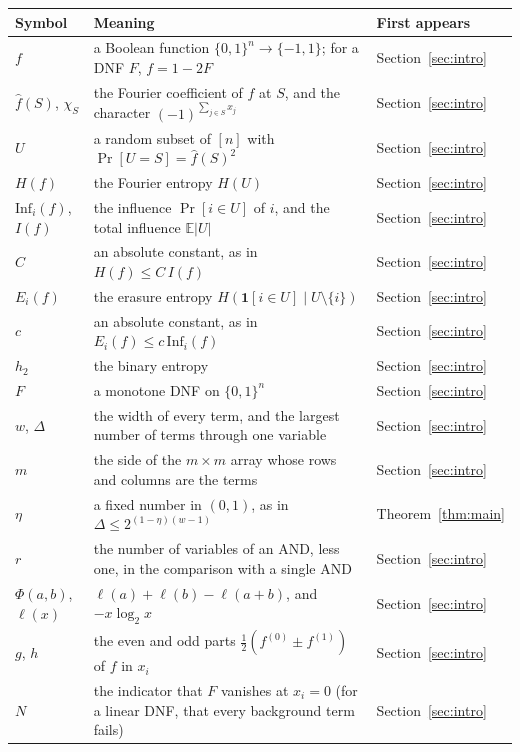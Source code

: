 \documentclass[11pt]{amsart}
\theoremstyle{remark}
\newcommand{\Inf}{\mathrm{Inf}}
\newcommand{\E}{\mathbb{E}}
\begin{document}
\begin{longtable}{@{}>{\raggedright\arraybackslash}p{}>{\raggedright\arraybackslash}p{}>{\raggedright\arraybackslash}p{}@{}}
\toprule
Symbol & Meaning & First appears \\
\midrule
\endhead
$f$ & a Boolean function $\{0,1\}^n\to\{-1,1\}$; for a DNF $F$, $f=1-2F$ & Section~\ref{sec:intro} \\
$\hat f(S)$, $\chi_S$ & the Fourier coefficient of $f$ at $S$, and the character $(-1)^{\sum_{j\in S}x_j}$ & Section~\ref{sec:intro} \\
$U$ & a random subset of $[n]$ with $\Pr[U=S]=\hat f(S)^2$ & Section~\ref{sec:intro} \\
$H(f)$ & the Fourier entropy $H(U)$ & Section~\ref{sec:intro} \\
$\Inf_i(f)$, $I(f)$ & the influence $\Pr[i\in U]$ of $i$, and the total influence $\E|U|$ & Section~\ref{sec:intro} \\
$C$ & an absolute constant, as in $H(f)\le C\,I(f)$ & Section~\ref{sec:intro} \\
$E_i(f)$ & the erasure entropy $H(\mathbf 1[i\in U]\mid U\setminus\{i\})$ & Section~\ref{sec:intro} \\
$c$ & an absolute constant, as in $E_i(f)\le c\,\Inf_i(f)$ & Section~\ref{sec:intro} \\
$h_2$ & the binary entropy & Section~\ref{sec:intro} \\
$F$ & a monotone DNF on $\{0,1\}^n$ & Section~\ref{sec:intro} \\
$w$, $\Delta$ & the width of every term, and the largest number of terms through one variable & Section~\ref{sec:intro} \\
$m$ & the side of the $m\times m$ array whose rows and columns are the terms & Section~\ref{sec:intro} \\
$\eta$ & a fixed number in $(0,1)$, as in $\Delta\le2^{(1-\eta)(w-1)}$ & Theorem~\ref{thm:main} \\
$r$ & the number of variables of an AND, less one, in the comparison with a single AND & Section~\ref{sec:intro} \\
$\Phi(a,b)$, $\ell(x)$ & $\ell(a)+\ell(b)-\ell(a+b)$, and $-x\log_2x$ & Section~\ref{sec:intro} \\
$g$, $h$ & the even and odd parts $\frac12(f^{(0)}\pm f^{(1)})$ of $f$ in $x_i$ & Section~\ref{sec:intro} \\
$N$ & the indicator that $F$ vanishes at $x_i=0$ (for a linear DNF, that every background term fails) & Section~\ref{sec:intro} \\

\end{longtable}
\end{document}
